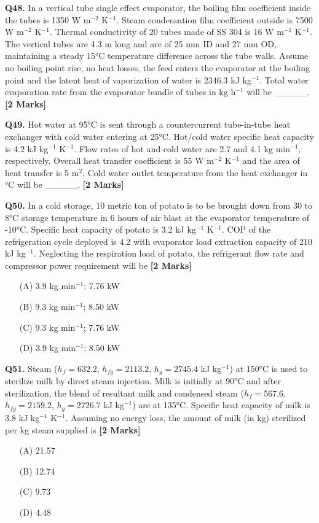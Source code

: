 \documentclass[11pt]{article}
\newcommand{\questionb}[2]{
    \noindent\textbf{Q#2.} #1 \hfill \textbf{[2 Marks]}
}
\begin{document}
\questionb{In a vertical tube single effect evaporator, the boiling film coefficient inside the tubes is 1350 W m$^{-2}$ K$^{-1}$. Steam condensation film coefficient outside is 7500 W m$^{-2}$ K$^{-1}$. Thermal conductivity of 20 tubes made of SS 304 is 16 W m$^{-1}$ K$^{-1}$. The vertical tubes are 4.3 m long and are of 25 mm ID and 27 mm OD, maintaining a steady 15°C temperature difference across the tube walls. Assume no boiling point rise, no heat losses, the feed enters the evaporator at the boiling point and the latent heat of vaporization of water is 2346.3 kJ kg$^{-1}$. Total water evaporation rate from the evaporator bundle of tubes in kg h$^{-1}$ will be \_\_\_\_\_.}{48}

\vspace{0.5cm}

\questionb{Hot water at 95°C is sent through a countercurrent tube-in-tube heat exchanger with cold water entering at 25°C. Hot/cold water specific heat capacity is 4.2 kJ kg$^{-1}$ K$^{-1}$. Flow rates of hot and cold water are 2.7 and 4.1 kg min$^{-1}$, respectively. Overall heat transfer coefficient is 55 W m$^{-2}$ K$^{-1}$ and the area of heat transfer is 5 m$^2$. Cold water outlet temperature from the heat exchanger in °C will be \_\_\_\_\_.}{49}

\vspace{0.5cm}

\questionb{In a cold storage, 10 metric ton of potato is to be brought down from 30 to 8°C storage temperature in 6 hours of air blast at the evaporator temperature of -10°C. Specific heat capacity of potato is 3.2 kJ kg$^{-1}$ K$^{-1}$. COP of the refrigeration cycle deployed is 4.2 with evaporator load extraction capacity of 210 kJ kg$^{-1}$. Neglecting the respiration load of potato, the refrigerant flow rate and compressor power requirement will be}{50}
\begin{enumerate}
    \item[(A)] 3.9 kg min$^{-1}$; 7.76 kW
    \item[(B)] 9.3 kg min$^{-1}$; 8.50 kW
    \item[(C)] 9.3 kg min$^{-1}$; 7.76 kW
    \item[(D)] 3.9 kg min$^{-1}$; 8.50 kW
\end{enumerate}

\vspace{0.5cm}

\questionb{Steam ($h_f = 632.2$, $h_{fg} = 2113.2$, $h_g = 2745.4$ kJ kg$^{-1}$) at 150°C is used to sterilize milk by direct steam injection. Milk is initially at 90°C and after sterilization, the blend of resultant milk and condensed steam ($h_f = 567.6$, $h_{fg} = 2159.2$, $h_g = 2726.7$ kJ kg$^{-1}$) are at 135°C. Specific heat capacity of milk is 3.8 kJ kg$^{-1}$ K$^{-1}$. Assuming no energy loss, the amount of milk (in kg) sterilized per kg steam supplied is}{51}
\begin{enumerate}
    \item[(A)] 21.57
    \item[(B)] 12.74
    \item[(C)] 9.73
    \item[(D)] 4.48
\end{enumerate}
\end{document}
